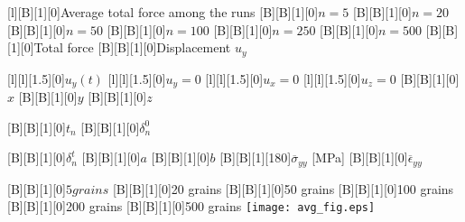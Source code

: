 \documentclass[border=12pt, crop]{standalone}
\begin{document}
  
  
      [l][B][1][0]{Average total force among the runs}
      [B][B][1][0]{$n = 5$}
      [B][B][1][0]{$n = 20$}
      [B][B][1][0]{$n = 50$}
      [B][B][1][0]{$n = 100$}
      [B][B][1][0]{$n = 250$}
      [B][B][1][0]{$n = 500$}
      [B][B][1][0]{Total force}
      [B][B][1][0]{Displacement $u_y$}
            
      [l][l][1.5][0]{$u_y(t)$}
      [l][l][1.5][0]{$u_y = 0$}
      [l][l][1.5][0]{$u_x = 0$}
      [l][l][1.5][0]{$u_z = 0$}
 [B][B][1][0]{$x$}
  [B][B][1][0]{$y$}  
  [B][B][1][0]{$z$}
  
    [B][B][1][0]{$t_n$}
        [B][B][1][0]{$\delta_n^0$}

    [B][B][1][0]{$\delta_n^t$}
    [B][B][1][0]{$a$}
    [B][B][1][0]{$b$}
     [B][B][1][180]{$\overline{\sigma}_{yy}$ [MPa]}
   [B][B][1][0]{$\overline{\epsilon}_{yy}$}

   [B][B][1][0]{$5 grains$}
 [B][B][1][0]{20 grains}
  [B][B][1][0]{50 grains}
   [B][B][1][0]{100 grains}
    [B][B][1][0]{200 grains}
    [B][B][1][0]{500 grains}
      \texttt{[image: avg\_fig.eps]}

    
\end{document}
